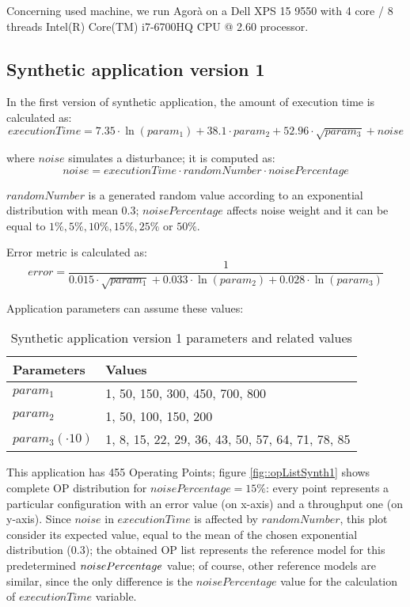 Concerning used machine, we run Agorà on a Dell XPS 15 9550 with 4 core / 8 threads Intel(R) Core(TM) i7-6700HQ CPU @ 2.60 processor.


\subsection{Synthetic application version 1}

In the first version of synthetic application, the amount of execution time is calculated as:
\[
executionTime = 7.35 \cdot \ln{(param_1)} + 38.1 \cdot param_2 + 52.96 \cdot \sqrt{param_3} + noise
\]

where $noise$ simulates a disturbance; it is computed as:
\[
noise = executionTime \cdot randomNumber \cdot noisePercentage
\]

$randomNumber$ is a generated random value according to an exponential distribution with mean 0.3; $noisePercentage$ affects noise weight and it can be equal to $1\%, 5\%, 10\%, 15\%, 25\%$ or $50\%$.

Error metric is calculated as:
\[
error = \dfrac{1}{0.015 \cdot \sqrt{param_1} + 0.033 \cdot \ln{(param_2)} + 0.028 \cdot \ln{(param_3)}}
\]

Application parameters can assume these values:

\begin{table}[h]

    \centering

    \begin{tabular}{ll}
    
        \toprule
        Parameters & Values \\
        \midrule
        $param_1$ & 1, 50, 150, 300, 450, 700, 800 \\
        $param_2$ & 1, 50, 100, 150, 200 \\
        $param_3 (\cdot 10)$ & 1, 8, 15, 22, 29, 36, 43, 50, 57, 64, 71, 78, 85 \\
        \bottomrule 
    
    \end{tabular}

    \caption{Synthetic application version 1 parameters and related values}

\end{table}

This application has 455 Operating Points; figure \ref{fig::opListSynth1} shows complete OP distribution for $noisePercentage = 15\%$: every point represents a particular configuration with an error value (on x-axis) and a throughput one (on y-axis). Since $noise$ in $executionTime$ is affected by $randomNumber$, this plot consider its expected value, equal to the mean of the chosen exponential distribution (0.3); the obtained OP list represents the reference model for this predetermined $noise\-Per\-cent\-age$ value; of course, other reference models are similar, since the only difference is the $noisePercentage$ value for the calculation of $executionTime$ variable.

